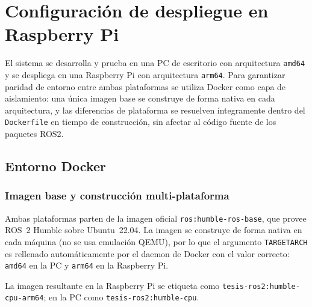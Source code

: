 %
%
%

\section{Configuración de despliegue en Raspberry Pi}
\label{sec:raspi-deploy}

El sistema se desarrolla y prueba en una PC de escritorio con arquitectura
\texttt{amd64} y se despliega en una Raspberry Pi con arquitectura
\texttt{arm64}. Para garantizar paridad de entorno entre ambas plataformas
se utiliza Docker como capa de aislamiento: una única imagen base se
construye de forma nativa en cada arquitectura, y las diferencias de
plataforma se resuelven íntegramente dentro del \texttt{Dockerfile} en tiempo
de construcción, sin afectar al código fuente de los paquetes ROS2.

\subsection{Entorno Docker}
\label{sec:docker-env}

\subsubsection{Imagen base y construcción multi-plataforma}

Ambas plataformas parten de la imagen oficial \texttt{ros:humble-ros-base},
que provee ROS~2 Humble sobre Ubuntu~22.04. La imagen se construye de forma
nativa en cada máquina (no se usa emulación QEMU), por lo que el argumento
\texttt{TARGETARCH} es rellenado automáticamente por el daemon de Docker con
el valor correcto: \texttt{amd64} en la PC y \texttt{arm64} en la Raspberry
Pi.

La imagen resultante en la Raspberry Pi se etiqueta como
\texttt{tesis-ros2:humble-cpu-arm64}; en la PC como
\texttt{tesis-ros2:humble-cpu}.

